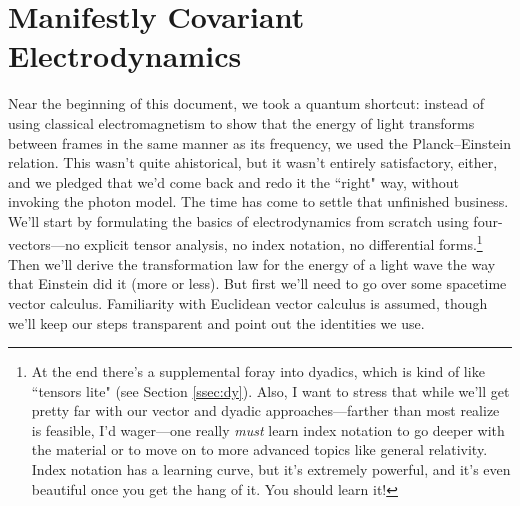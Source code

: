 \documentclass[12pt]{article}
\renewcommand{\vv}[1]{\mathbf{#1}}
\begin{document}



\clearpage

\section{Manifestly Covariant Electrodynamics}\label{sec:rem}

Near the beginning of this document, we took a quantum shortcut: instead of using classical electromagnetism to show that the energy of light transforms between frames in the same manner as its frequency, we used the Planck--Einstein relation. This wasn't quite ahistorical, but it wasn't entirely satisfactory, either, and we pledged that we'd come back and redo it the ``right" way, without invoking the photon model. The time has come to settle that unfinished business. We'll start by formulating the basics of electrodynamics from scratch using four-vectors---no explicit tensor analysis, no index notation, no differential forms.\footnote{At the end there's a supplemental foray into dyadics, which is kind of like ``tensors lite" (see Section \ref{ssec:dy}). Also, I want to stress that while we'll get pretty far with our vector and dyadic approaches---farther than most realize is feasible, I'd wager---one really \emph{must} learn index notation to go deeper with the material or to move on to more advanced topics like general relativity. Index notation has a learning curve, but it's extremely powerful, and it's even beautiful once you get the hang of it. You should learn it!} Then we'll derive the transformation law for the energy of a light wave the way that Einstein did it (more or less). But first we'll need to go over some spacetime vector calculus. Familiarity with Euclidean vector calculus is assumed, though we'll keep our steps transparent and point out the identities we use.
\end{document}
